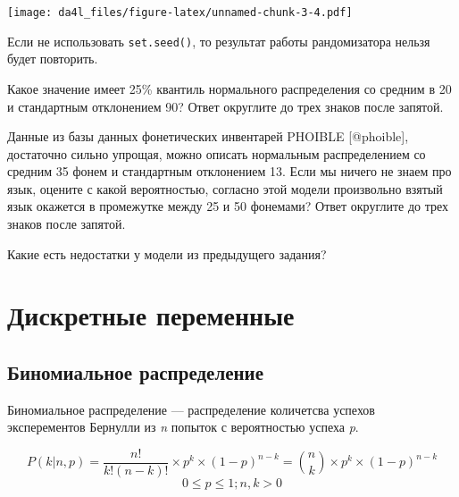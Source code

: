 \documentclass[
]{book}
\makeatletter
\newenvironment{kframe}{%
    \medskip{}
    \setlength{\fboxsep}{.8em}
    \def\at@end@of@kframe{}%
    \ifinner\ifhmode%
    \def\at@end@of@kframe{\end{minipage}}%
    \begin{minipage}{\columnwidth}%
    \fi\fi%
    \def\FrameCommand##1{\hskip\@totalleftmargin \hskip-\fboxsep
    \colorbox{shadecolor}{##1}\hskip-\fboxsep
        \hskip-\linewidth \hskip-\@totalleftmargin \hskip\columnwidth}%
    \MakeFramed {\advance\hsize-\width
      \@totalleftmargin\z@ \linewidth\hsize
      \@setminipage}}%
  {\par\unskip\endMakeFramed%
    \at@end@of@kframe}
\newenvironment{rmdblock}[1]
  {
    \begin{itemize}
    \renewcommand{\labelitemi}{
      \raisebox{-.7\height}[0pt][0pt]{
        {\setkeys{Gin}{width=3em,keepaspectratio}\texttt{[image: images/\#1]}}
        }
        }
        \setlength{\fboxsep}{1em}
        \begin{kframe}
        \item
      }
      {
        \end{kframe}
        \end{itemize}
      }
\newenvironment{rmdtask}
      {\begin{rmdblock}{task}}
      {\end{rmdblock}}
\makeatother
\begin{document}
\texttt{[image: da4l\_files/figure-latex/unnamed-chunk-3-4.pdf]}

Если не использовать \texttt{set.seed()}, то результат работы рандомизатора нельзя будет повторить.

\begin{rmdtask}
Какое значение имеет 25\% квантиль нормального распределения со средним
в 20 и стандартным отклонением 90? Ответ округлите до трех знаков после
запятой.
\end{rmdtask}

\begin{rmdtask}
Данные из базы данных фонетических инвентарей PHOIBLE {[}@phoible{]},
достаточно сильно упрощая, можно описать нормальным распределением со
средним 35 фонем и стандартным отклонением 13. Если мы ничего не знаем
про язык, оцените с какой вероятностью, согласно этой модели произвольно
взятый язык окажется в промежутке между 25 и 50 фонемами? Ответ
округлите до трех знаков после запятой.
\end{rmdtask}

\begin{rmdtask}
Какие есть недостатки у модели из предыдущего задания?
\end{rmdtask}

\hypertarget{ux434ux438ux441ux43aux440ux435ux442ux43dux44bux435-ux43fux435ux440ux435ux43cux435ux43dux43dux44bux435}{%
\section{Дискретные переменные}\label{ux434ux438ux441ux43aux440ux435ux442ux43dux44bux435-ux43fux435ux440ux435ux43cux435ux43dux43dux44bux435}}

\hypertarget{ux431ux438ux43dux43eux43cux438ux430ux43bux44cux43dux43eux435-ux440ux430ux441ux43fux440ux435ux434ux435ux43bux435ux43dux438ux435}{%
\subsection{Биномиальное распределение}\label{ux431ux438ux43dux43eux43cux438ux430ux43bux44cux43dux43eux435-ux440ux430ux441ux43fux440ux435ux434ux435ux43bux435ux43dux438ux435}}

Биномиальное распределение --- распределение количетсва успехов эксперементов Бернулли из \emph{n} попыток с вероятностью успеха \emph{p}.

\[P(k | n, p) = \frac{n!}{k!(n-k)!} \times p^k \times (1-p)^{n-k} =  {n \choose k} \times p^k \times (1-p)^{n-k}\]
\[ 0 \leq p \leq 1; n, k > 0\]
\end{document}
